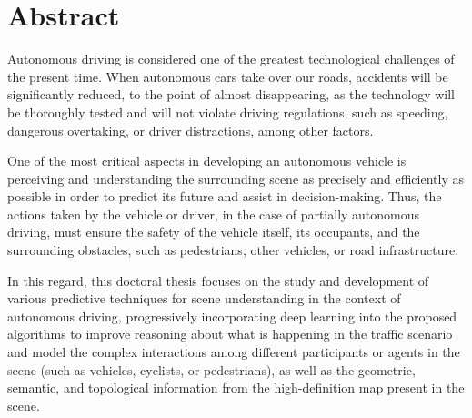 %
%
%
% 
%
%
%
%

\chapter*{Abstract}
\label{cha:abstract}


Autonomous driving is considered one of the greatest technological challenges of the present time. When autonomous cars take over our roads, accidents will be significantly reduced, to the point of almost disappearing, as the technology will be thoroughly tested and will not violate driving regulations, such as speeding, dangerous overtaking, or driver distractions, among other factors.

One of the most critical aspects in developing an autonomous vehicle is perceiving and understanding the surrounding scene as precisely and efficiently as possible in order to predict its future and assist in decision-making. Thus, the actions taken by the vehicle or driver, in the case of partially autonomous driving, must ensure the safety of the vehicle itself, its occupants, and the surrounding obstacles, such as pedestrians, other vehicles, or road infrastructure.

In this regard, this doctoral thesis focuses on the study and development of various predictive techniques for scene understanding in the context of autonomous driving, progressively incorporating deep learning into the proposed algorithms to improve reasoning about what is happening in the traffic scenario and model the complex interactions among different participants or agents in the scene (such as vehicles, cyclists, or pedestrians), as well as the geometric, semantic, and topological information from the high-definition map present in the scene.

